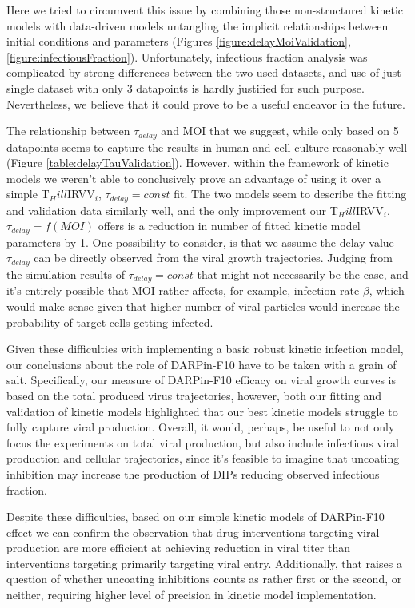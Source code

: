 Here we tried to circumvent this issue by combining those non-structured kinetic models with data-driven models untangling the implicit relationships between initial conditions and parameters (Figures \ref{figure:delayMoiValidation}, \ref{figure:infectiousFraction}). Unfortunately, infectious fraction analysis was complicated by strong differences between the two used datasets, and use of just single dataset with only 3 datapoints is hardly justified for such purpose. Nevertheless, we believe that it could prove to be a useful endeavor in the future.

The relationship between $\tau_{delay}$ and MOI that we suggest, while only based on 5 datapoints seems to capture the results in human and cell culture reasonably well (Figure \ref{table:delayTauValidation}). However, within the framework of kinetic models we weren't able to conclusively prove an advantage of using it over a simple T$_Hill$IRVV$_i$, $\tau_{delay} = const$ fit. The two models seem to describe the fitting and validation data similarly well, and the only improvement our T$_Hill$IRVV$_i$, $\tau_{delay} = f(MOI)$ offers is a reduction in number of fitted kinetic model parameters by 1. One possibility to consider, is that we assume the delay value $\tau_{delay}$ can be directly observed from the viral growth trajectories. Judging from the simulation results of $\tau_{delay} = const$ that might not necessarily be the case, and it's entirely possible that MOI rather affects, for example, infection rate $\beta$, which would make sense given that higher number of viral particles would increase the probability of target cells getting infected. 

Given these difficulties with implementing a basic robust kinetic infection model, our conclusions about the role of DARPin-F10 have to be taken with a grain of salt. Specifically, our measure of DARPin-F10 efficacy on viral growth curves is based on the total produced virus trajectories, however, both our fitting and validation of kinetic models highlighted that our best kinetic models struggle to fully capture viral production. Overall, it would, perhaps, be useful to not only focus the experiments on total viral production, but also include infectious viral production and cellular trajectories, since it's feasible to imagine that uncoating inhibition may increase the production of DIPs reducing observed infectious fraction.

Despite these difficulties, based on our simple kinetic models of DARPin-F10 effect we can confirm the observation \cite{heldt2013multiscale} that drug interventions targeting viral production are more efficient at achieving reduction in viral titer than interventions targeting primarily targeting viral entry. Additionally, that raises a question of whether uncoating inhibitions counts as rather first or the second, or neither, requiring higher level of precision in kinetic model implementation.